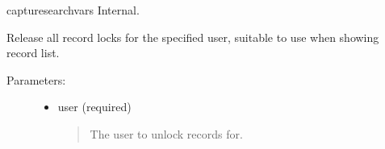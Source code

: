 \documentclass[letterpaper,10pt,english]{sphinxmanual}
\begin{document}
\begin{fulllineitems}
\begin{fulllineitems}
\end{fulllineitems}


\begin{fulllineitems}
\label{knop_database:knop_database.capturesearchvars}
capturesearchvars Internal.

\end{fulllineitems}


\begin{fulllineitems}
\label{knop_database:knop_database.clearlocks}
\end{fulllineitems}


\begin{fulllineitems}
Release all record locks for the specified user, suitable to use when showing
record list.
\begin{description}
\item[{Parameters:}] \leavevmode\begin{itemize}
\item {} 
user (required)
\begin{quote}

The user to unlock records for.
\end{quote}

\end{itemize}

\end{description}

\end{fulllineitems}


\begin{fulllineitems}
\label{knop_database:knop_database.current_record}
\end{fulllineitems}



\begin{fulllineitems}
\end{fulllineitems}


\end{fulllineitems}
\end{document}
